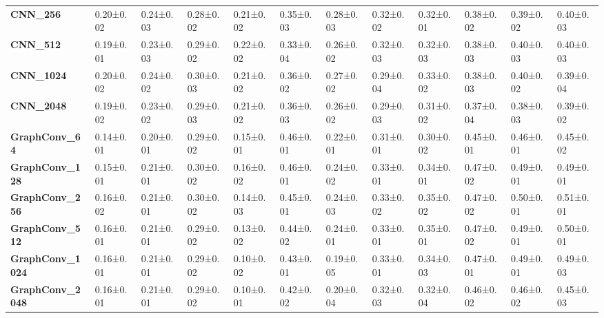 \begin{tabular}{llllllllllll}
\textbf{CNN\_256       } &         0.20±0.02 &        0.24±0.03 &        0.28±0.02 &       0.21±0.02 &        0.35±0.03 &       0.28±0.03 &        0.32±0.02 &       0.32±0.01 &       0.38±0.02 &        0.39±0.02 &        0.40±0.03 \\
\textbf{CNN\_512       } &         0.19±0.01 &        0.23±0.03 &        0.29±0.02 &       0.22±0.02 &        0.33±0.04 &       0.26±0.02 &        0.32±0.03 &       0.32±0.03 &       0.38±0.03 &        0.40±0.03 &        0.40±0.03 \\
\textbf{CNN\_1024      } &         0.20±0.02 &        0.24±0.02 &        0.30±0.03 &       0.21±0.02 &        0.36±0.02 &       0.27±0.02 &        0.29±0.04 &       0.33±0.02 &       0.38±0.03 &        0.40±0.02 &        0.39±0.04 \\
\textbf{CNN\_2048      } &         0.19±0.02 &        0.23±0.02 &        0.29±0.03 &       0.21±0.02 &        0.36±0.03 &       0.26±0.02 &        0.29±0.03 &       0.31±0.02 &       0.37±0.04 &        0.38±0.03 &        0.39±0.02 \\
\textbf{GraphConv\_64  } &         0.14±0.01 &        0.20±0.01 &        0.29±0.02 &       0.15±0.01 &        0.46±0.01 &       0.22±0.01 &        0.31±0.01 &       0.30±0.02 &       0.45±0.01 &        0.46±0.01 &        0.45±0.02 \\
\textbf{GraphConv\_128 } &         0.15±0.01 &        0.21±0.01 &        0.30±0.02 &       0.16±0.02 &        0.46±0.01 &       0.24±0.02 &        0.33±0.01 &       0.34±0.01 &       0.47±0.02 &        0.49±0.01 &        0.49±0.01 \\
\textbf{GraphConv\_256 } &         0.16±0.02 &        0.21±0.01 &        0.30±0.02 &       0.14±0.03 &        0.45±0.01 &       0.24±0.03 &        0.33±0.02 &       0.35±0.02 &       0.47±0.02 &        0.50±0.01 &        0.51±0.01 \\
\textbf{GraphConv\_512 } &         0.16±0.01 &        0.21±0.01 &        0.29±0.02 &       0.13±0.02 &        0.44±0.02 &       0.24±0.01 &        0.33±0.01 &       0.35±0.01 &       0.47±0.02 &        0.49±0.01 &        0.50±0.01 \\
\textbf{GraphConv\_1024} &         0.16±0.01 &        0.21±0.01 &        0.29±0.02 &       0.10±0.02 &        0.43±0.01 &       0.19±0.05 &        0.33±0.01 &       0.34±0.03 &       0.47±0.01 &        0.49±0.01 &        0.49±0.03 \\
\textbf{GraphConv\_2048} &         0.16±0.01 &        0.21±0.01 &        0.29±0.02 &       0.10±0.01 &        0.42±0.02 &       0.20±0.04 &        0.32±0.03 &       0.32±0.04 &       0.46±0.02 &        0.46±0.02 &        0.45±0.03 \\
\bottomrule
\end{tabular}
